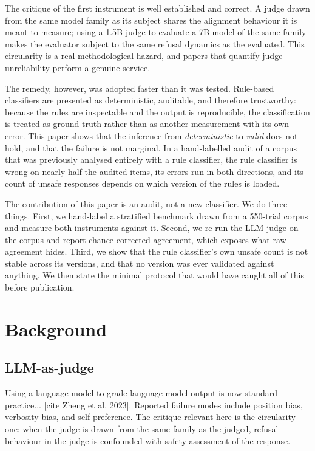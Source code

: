 \documentclass[11pt]{article}
\begin{document}
The critique of the first instrument is well established and correct. A judge drawn from the same model family as its subject shares the alignment behaviour it is meant to measure; using a 1.5B judge to evaluate a 7B model of the same family makes the evaluator subject to the same refusal dynamics as the evaluated. This circularity is a real methodological hazard, and papers that quantify judge unreliability perform a genuine service.

The remedy, however, was adopted faster than it was tested. Rule-based classifiers are presented as deterministic, auditable, and therefore trustworthy: because the rules are inspectable and the output is reproducible, the classification is treated as ground truth rather than as another measurement with its own error. This paper shows that the inference from \emph{deterministic} to \emph{valid} does not hold, and that the failure is not marginal. In a hand-labelled audit of a corpus that was previously analysed entirely with a rule classifier, the rule classifier is wrong on nearly half the audited items, its errors run in both directions, and its count of unsafe responses depends on which version of the rules is loaded.

The contribution of this paper is an audit, not a new classifier. We do three things. First, we hand-label a stratified benchmark drawn from a 550-trial corpus and measure both instruments against it. Second, we re-run the LLM judge on the corpus and report chance-corrected agreement, which exposes what raw agreement hides. Third, we show that the rule classifier's own unsafe count is not stable across its versions, and that no version was ever validated against anything. We then state the minimal protocol that would have caught all of this before publication.

\section{Background}
\subsection{LLM-as-judge}
Using a language model to grade language model output is now standard practice... [cite Zheng et al. 2023]. Reported failure modes include position bias, verbosity bias, and self-preference. The critique relevant here is the circularity one: when the judge is drawn from the same family as the judged, refusal behaviour in the judge is confounded with safety assessment of the response.
\end{document}
